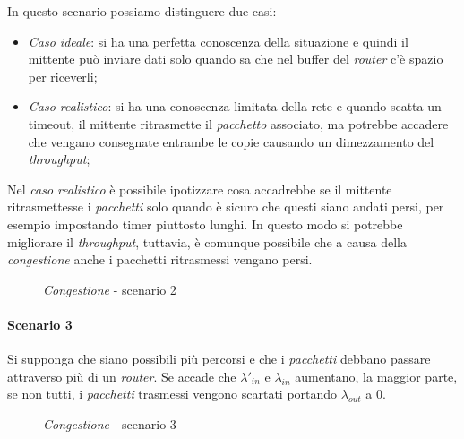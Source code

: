 In questo scenario possiamo distinguere due casi:
\begin{itemize}
    \item \emph{Caso ideale}: si ha una perfetta conoscenza della situazione e
    quindi il mittente può inviare dati solo quando sa che nel buffer del
    \emph{router} c'è spazio per riceverli;
    \item \emph{Caso realistico}: si ha una conoscenza limitata della rete e
    quando scatta un timeout, il mittente ritrasmette il \emph{pacchetto}
    associato, ma potrebbe accadere che vengano consegnate entrambe le copie
    causando un dimezzamento del \emph{throughput};
\end{itemize}\noindent
Nel \emph{caso realistico} è possibile ipotizzare cosa accadrebbe se il mittente
ritrasmettesse i \emph{pacchetti} solo quando è sicuro che questi siano andati
persi, per esempio impostando timer piuttosto lunghi. In questo modo si potrebbe
migliorare il \emph{throughput}, tuttavia, è comunque possibile che a causa della
\emph{congestione} anche i pacchetti ritrasmessi vengano persi.
\begin{figure}[ht!]
    \centering
    \hfill
    \hfill
    \caption{\emph{Congestione} - scenario 2}
\end{figure}

\paragraph{Scenario 3}
Si supponga che siano possibili più percorsi e che i \emph{pacchetti} debbano
passare attraverso più di un \emph{router}. Se accade che $\lambda'_{in}$ e
$\lambda_{in}$ aumentano, la maggior parte, se non tutti, i \emph{pacchetti}
trasmessi vengono scartati portando $\lambda_{out}$ a 0.

\begin{figure}[h!]
    \centering
    \hfill
    \caption{\emph{Congestione} - scenario 3}
\end{figure}

